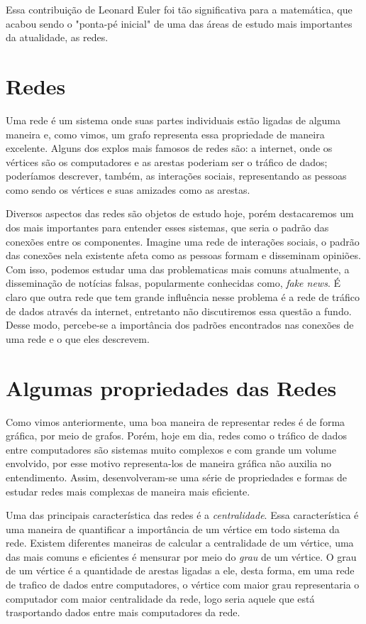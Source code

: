 \documentclass{article}
\begin{document}
Essa contribuição de Leonard Euler foi tão significativa para a matemática, que acabou sendo o "ponta-pé inicial" de uma das áreas de estudo mais importantes da atualidade, as redes.

\section{Redes}

Uma rede é um sistema onde suas partes individuais estão ligadas de alguma maneira e, como vimos, um grafo representa essa propriedade de maneira excelente. Alguns dos explos mais famosos de redes são: a internet, onde os vértices são os computadores e as arestas poderiam ser o tráfico de dados; poderíamos descrever, também, as interações sociais, representando as pessoas como sendo os vértices e suas amizades como as arestas.



Diversos aspectos das redes são objetos de estudo hoje, porém destacaremos um dos mais importantes para entender esses sistemas, que seria o padrão das conexões entre os componentes. Imagine uma rede de interações sociais, o padrão das conexões nela existente afeta como as pessoas formam e disseminam opiniões. Com isso, podemos estudar uma das problematicas mais comuns atualmente, a disseminação de notícias falsas, popularmente conhecidas como,  \textit{fake news}. É claro que outra rede que tem grande influência nesse problema é a rede de tráfico de dados através da internet, entretanto não discutiremos essa questão a fundo. Desse modo, percebe-se a importância dos padrões encontrados nas conexões de uma rede e o que eles descrevem.
 
\section{Algumas propriedades das Redes}

Como vimos anteriormente, uma boa maneira de representar redes é de forma gráfica, por meio de grafos. Porém, hoje em dia, redes como o tráfico de dados entre computadores são sistemas muito complexos e com grande um volume envolvido, por esse motivo representa-los de maneira gráfica não auxilia no entendimento. Assim, desenvolveram-se uma série de propriedades e formas de estudar redes mais complexas de maneira mais eficiente.


Uma das principais característica das redes é a \textit{centralidade}. Essa característica é uma maneira de quantificar a importância de um vértice em todo sistema da rede. Existem diferentes maneiras de calcular a centralidade de um vértice, uma das mais comuns e eficientes é mensurar por meio do \textit{grau} de um vértice. O grau de um vértice é a quantidade de arestas ligadas a ele, desta forma, em uma rede de trafico de dados entre computadores, o vértice com maior grau representaria o computador com maior centralidade da rede, logo seria aquele que está trasportando dados entre mais computadores da rede.
\end{document}

